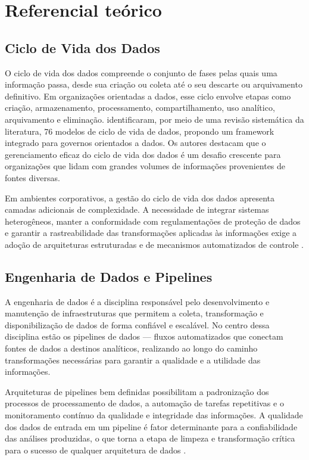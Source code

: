 \documentclass[
    12pt,                %
    openright,           %
    oneside,             %
    a4paper,             %
    english,             %
    brazil               %
]{abntex2}
\begin{document}
\section{Referencial teórico}
\label{sec:referencial}

\subsection{Ciclo de Vida dos Dados}

O ciclo de vida dos dados compreende o conjunto de fases pelas quais uma informação passa, desde sua criação ou coleta até o seu descarte ou arquivamento definitivo. Em organizações orientadas a dados, esse ciclo envolve etapas como criação, armazenamento, processamento, compartilhamento, uso analítico, arquivamento e eliminação.  identificaram, por meio de uma revisão sistemática da literatura, 76 modelos de ciclo de vida de dados, propondo um framework integrado para governos orientados a dados. Os autores destacam que o gerenciamento eficaz do ciclo de vida dos dados é um desafio crescente para organizações que lidam com grandes volumes de informações provenientes de fontes diversas.

Em ambientes corporativos, a gestão do ciclo de vida dos dados apresenta camadas adicionais de complexidade. A necessidade de integrar sistemas heterogêneos, manter a conformidade com regulamentações de proteção de dados e garantir a rastreabilidade das transformações aplicadas às informações exige a adoção de arquiteturas estruturadas e de mecanismos automatizados de controle \cite{Scope2022}.

\subsection{Engenharia de Dados e Pipelines}

A engenharia de dados é a disciplina responsável pelo desenvolvimento e manutenção de infraestruturas que permitem a coleta, transformação e disponibilização de dados de forma confiável e escalável. No centro dessa disciplina estão os pipelines de dados — fluxos automatizados que conectam fontes de dados a destinos analíticos, realizando ao longo do caminho transformações necessárias para garantir a qualidade e a utilidade das informações.

Arquiteturas de pipelines bem definidas possibilitam a padronização dos processos de processamento de dados, a automação de tarefas repetitivas e o monitoramento contínuo da qualidade e integridade das informações. A qualidade dos dados de entrada em um pipeline é fator determinante para a confiabilidade das análises produzidas, o que torna a etapa de limpeza e transformação crítica para o sucesso de qualquer arquitetura de dados \cite{Valova2025}.
\end{document}
